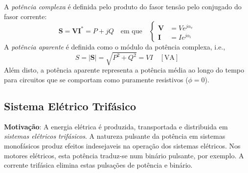 \noindent A \textit{potência complexa} é definida pelo produto do fasor tensão pelo conjugado do fasor corrente:
$$
    \mathbf{S} = \mathbf{V} \mathbf{I}^* = P + jQ \quad\text{em que}\quad
    \left\{\begin{aligned}
        \mathbf{V} &= V e^{j\alpha_v} \\
        \mathbf{I} &= I e^{j\alpha_i}
    \end{aligned}\right.
$$
A \textit{potência aparente} é definida como o módulo da potência complexa, i.e.,
$$
    S = |\mathbf{S}| = \sqrt{P^2 + Q^2} = VI \quad [\text{VA}]
$$
Além disto, a potência aparente representa a potência média ao longo do tempo para circuitos que se comportam como puramente resistivos ($\phi=0$).
\subsection{Sistema Elétrico Trifásico}

\noindent \textbf{Motivação}: A energia elétrica é produzida, transportada e distribuida em \textit{sistemas elétricos trifásicos}. A natureza pulsante da potência em sistemas monofásicos produz efeitos indesejaveis na operação dos sistemas elétricos. Nos motores elétricos, esta potência traduz-se num binário pulsante, por exemplo. A corrente trifásica elimina estas pulsações de potência e binário.

